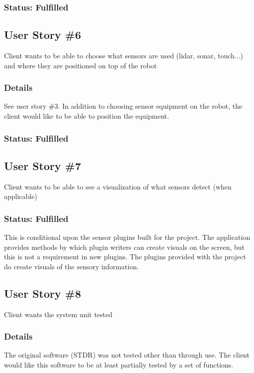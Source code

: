 \subsubsection*{Status: Fulfilled}

\subsection{User Story \#6} 
Client wants to be able to choose what sensors are used (lidar, sonar, touch...) and where they are positioned on top of the robot

\subsubsection*{Details}
See user story \#3. In addition to choosing sensor equipment on the robot, the client would like to be able to position the equipment.

\subsubsection*{Status: Fulfilled}

\subsection{User Story \#7} 
Client wants to be able to see a visualization of what sensors detect (when applicable)

\subsubsection*{Status: Fulfilled}
This is conditional upon the sensor plugins built for the project. The application provides methods by which plugin writers can create visuals on the screen, but this is not a requirement in new plugins. The plugins provided with the project do create visuals of the sensory information.

\subsection{User Story \#8} 
Client wants the system unit tested

\subsubsection*{Details}
The original software (STDR) was not tested other than through use. The client would like this software to be at least partially tested by a set of functions.

